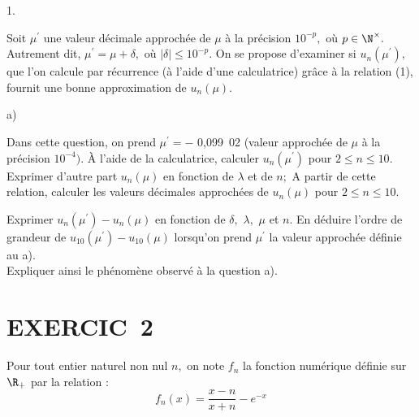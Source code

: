 \documentclass[11pt]{article}%
\begin{document}
\begin{noliste}{1.}
\item Soit $\mu ^{\prime }$ une valeur décimale approchée de $\mu $ à
la précision $10^{-p},$ où $p\in \N^{\times }.$ Autrement dit, $\mu
^{\prime } = \mu + \delta,$ où $\left| \delta \right| \leq
10^{-p}.$ On se propose d'examiner si $u_{n}(\mu ^{\prime }),$ que l'on
calcule par récurrence (à l'aide d'une calculatrice) grâce à la
relation
(1), fournit une bonne approximation de $u_{n}(\mu ).$

\begin{noliste}{a)}
 \setlength{\itemsep}{2mm}
\item Dans cette question, on prend $\mu ^{\prime } = -$ 0,099\ 02
(valeur
approchée de $\mu $ à la précision $10^{-4}).$ À l'aide de la
calculatrice,
calculer $u_{n}(\mu ^{\prime })$ pour $2\leq n\leq 10.$ Exprimer
d'autre part $u_{n}(\mu )$ en fonction de $\lambda $ et de $n;$ A
partir de
cette relation, calculer les valeurs décimales approchées de $u_{n}(\mu
)$
pour $2\leq n\leq 10.$

\item Exprimer $u_{n}(\mu ^{\prime })-u_{n}(\mu )$ en fonction de
$\delta,$ 
$\lambda,$ $\mu $ et $n.$ En déduire l'ordre de grandeur de $u_{10}(\mu
^{\prime })-u_{10}(\mu )$ lorsqu'on prend $\mu ^{\prime }$ la valeur
approchée définie au a).\\
Expliquer ainsi le phénomène observé à la question a).
\end{noliste}
\end{noliste}

\section*{EXERCIC\E\ 2}

Pour tout entier naturel non nul $n,$ on note $f_{n}$ la fonction
numérique définie sur $\R_{+}$ par la relation :
\[
f_{n}(x) = \dfrac{x-n}{x + n}-e^{-x}
\]
\end{document}
